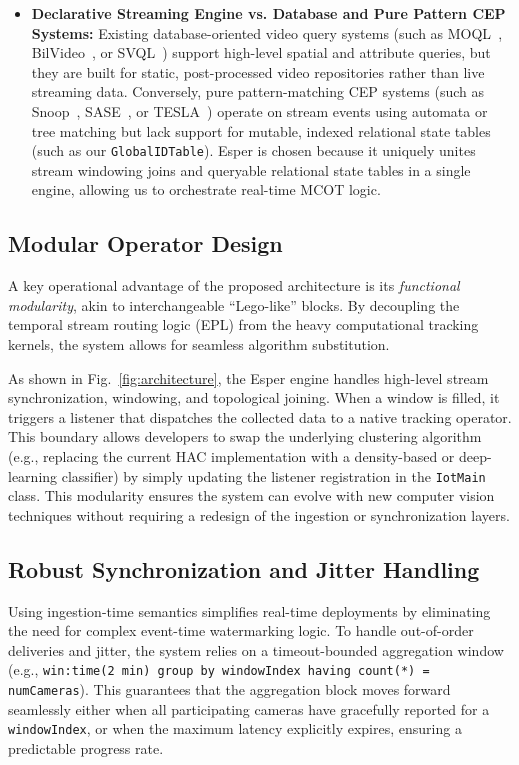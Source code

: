 \documentclass[11pt]{article}
\begin{document}
\begin{itemize}[leftmargin=*]
    \item \textbf{Declarative Streaming Engine vs. Database and Pure Pattern CEP Systems:} Existing database-oriented video query systems (such as MOQL~\cite{li1997moql}, BilVideo~\cite{donderler2005bilvideo}, or SVQL~\cite{lu2015svql}) support high-level spatial and attribute queries, but they are built for static, post-processed video repositories rather than live streaming data. Conversely, pure pattern-matching CEP systems (such as Snoop~\cite{chakravarthy1994snoop}, SASE~\cite{wu2006sase}, or TESLA~\cite{cugola2010tesla}) operate on stream events using automata or tree matching but lack support for mutable, indexed relational state tables (such as our \texttt{GlobalIDTable}). Esper is chosen because it uniquely unites stream windowing joins and queryable relational state tables in a single engine, allowing us to orchestrate real-time MCOT logic.
\end{itemize}

\subsection{Modular Operator Design}
A key operational advantage of the proposed architecture is its \emph{functional modularity}, akin to interchangeable ``Lego-like'' blocks. By decoupling the temporal stream routing logic (EPL) from the heavy computational tracking kernels, the system allows for seamless algorithm substitution. 

As shown in Fig.~\ref{fig:architecture}, the Esper engine handles high-level stream synchronization, windowing, and topological joining. When a window is filled, it triggers a listener that dispatches the collected data to a native tracking operator. This boundary allows developers to swap the underlying clustering algorithm (e.g., replacing the current HAC implementation with a density-based or deep-learning classifier) by simply updating the listener registration in the \texttt{IotMain} class. This modularity ensures the system can evolve with new computer vision techniques without requiring a redesign of the ingestion or synchronization layers.

\subsection{Robust Synchronization and Jitter Handling}
Using ingestion-time semantics simplifies real-time deployments by eliminating the need for complex event-time watermarking logic. To handle out-of-order deliveries and jitter, the system relies on a timeout-bounded aggregation window (e.g., \texttt{win:time(2 min) group by windowIndex having count(*) = numCameras}). This guarantees that the aggregation block moves forward seamlessly either when all participating cameras have gracefully reported for a \texttt{windowIndex}, or when the maximum latency explicitly expires, ensuring a predictable progress rate.
\end{document}
